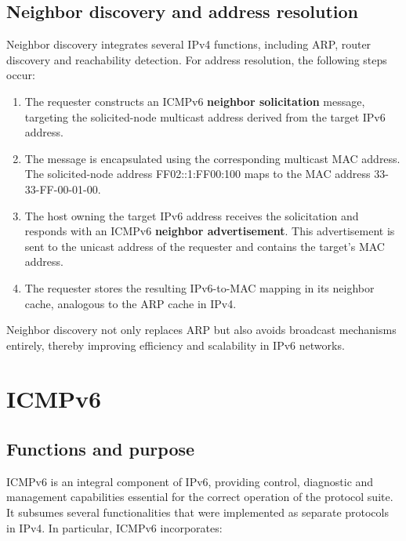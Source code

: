 \begin{center}
\end{center}

\subsection{Neighbor discovery and address resolution}

Neighbor discovery integrates several IPv4 functions, including ARP, router discovery and reachability detection. For address resolution, the following steps occur:

\begin{enumerate}
\item The requester constructs an ICMPv6 \textbf{neighbor solicitation} message, targeting the solicited-node multicast address derived from the target IPv6 address.
\item The message is encapsulated using the corresponding multicast MAC address. The solicited-node address FF02::1:FF00:100 maps to the MAC address 33-33-FF-00-01-00.
\item The host owning the target IPv6 address receives the solicitation and responds with an ICMPv6 \textbf{neighbor advertisement}. This advertisement is sent to the unicast address of the requester and contains the target's MAC address.
\item The requester stores the resulting IPv6-to-MAC mapping in its neighbor cache, analogous to the ARP cache in IPv4.
\end{enumerate}

Neighbor discovery not only replaces ARP but also avoids broadcast mechanisms entirely, thereby improving efficiency and scalability in IPv6 networks.

\begin{center}
\end{center}

\section{ICMPv6}

\subsection{Functions and purpose}

ICMPv6 is an integral component of IPv6, providing control, diagnostic and management capabilities essential for the correct operation of the protocol suite. It subsumes several functionalities that were implemented as separate protocols in IPv4. In particular, ICMPv6 incorporates:

